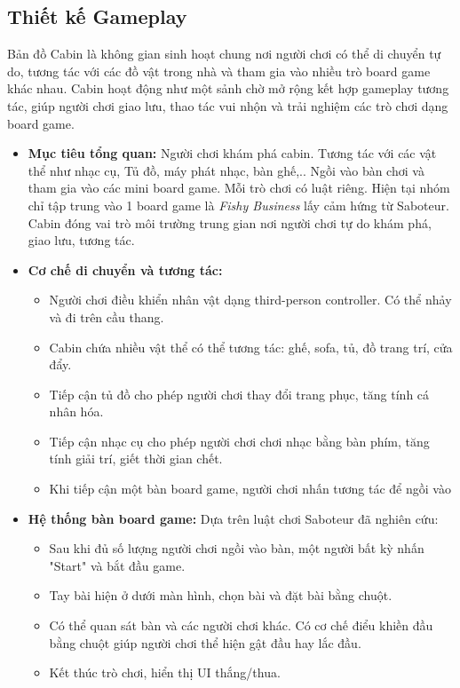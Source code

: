 \subsection{Thiết kế Gameplay}

Bản đồ Cabin là không gian sinh hoạt chung nơi người chơi
có thể di chuyển tự do, tương tác với các đồ vật trong nhà và tham gia vào nhiều trò board game khác nhau. Cabin hoạt động như một sảnh chờ mở rộng kết hợp gameplay tương tác, giúp người chơi giao lưu, thao tác vui nhộn và trải nghiệm các trò chơi dạng board game.

\begin{itemize}

    \item \textbf{Mục tiêu tổng quan:}  
    Người chơi khám phá cabin. Tương tác với các vật thể như nhạc cụ, Tủ đồ, máy phát nhạc, bàn ghế,.. Ngồi vào bàn chơi và tham gia vào các mini board game. Mỗi trò chơi có luật riêng. Hiện tại nhóm chỉ tập trung vào 1 board game là \textit{Fishy Business} lấy cảm hứng từ Saboteur. Cabin đóng vai trò môi trường trung gian nơi người chơi tự do khám phá, giao lưu, tương tác.

    \item \textbf{Cơ chế di chuyển và tương tác:}  
    \begin{itemize}
        \item Người chơi điều khiển nhân vật dạng third-person controller. Có thể nhảy và đi trên cầu thang.
        \item Cabin chứa nhiều vật thể có thể tương tác: ghế, sofa, tủ, đồ trang trí, cửa đẩy.
        \item Tiếp cận tủ đồ cho phép người chơi thay đổi trang phục, tăng tính cá nhân hóa.
        \item Tiếp cận nhạc cụ cho phép người chơi chơi nhạc bằng bàn phím, tăng tính giải trí, giết thời gian chết.
        \item Khi tiếp cận một bàn board game, người chơi nhấn tương tác để ngồi vào 
    \end{itemize}

    \item \textbf{Hệ thống bàn board game:}  
    Dựa trên luật chơi Saboteur đã nghiên cứu:
    \begin{itemize}
        \item Sau khi đủ số lượng người chơi ngồi vào bàn, một người bất kỳ nhấn "Start" và bắt đầu game.
        \item Tay bài hiện ở dưới màn hình, chọn bài và đặt bài bằng chuột.
        \item Có thể quan sát bàn và các người chơi khác. Có cơ chế điểu khiền đầu bằng chuột giúp người chơi thể hiện gật đầu hay lắc đầu.
        \item Kết thúc trò chơi, hiển thị UI thắng/thua.
    \end{itemize}


\end{itemize}
